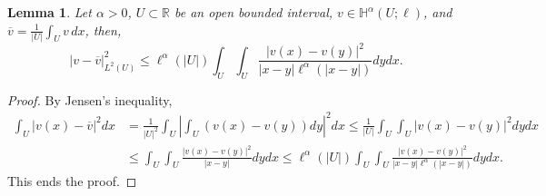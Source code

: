 \documentclass[10 pt]{article}
\newtheorem{lemma}[theorem]{Lemma}
\numberwithin{equation}{section}
\def\R{\mathbb{R}}
\begin{document}
\begin{lemma}\label{lem:poincare_type_weight}
Let $\alpha>0$, $U\subset \R$ be an open bounded interval, $v\in \mathbb H^{\alpha}(U;\ell)$, and $\overline v=\frac{1}{|U|}\int_{U}v\, dx$, then,
%
\begin{equation*}
    |v-\overline{v}|_{L^2(U)}^2\leq \ell^{\alpha}(|U|)\int_{U}\int_{U}\frac{|v(x)-v(y)|^2}{|x-y|\ell^{\alpha}(|x-y|)}dy dx.
\end{equation*}
%
\end{lemma}
%
\begin{proof}
By Jensen's inequality,
%
\begin{align*}
    \int_{U}|v(x)-\overline{v}|^2dx
    &=\frac{1}{|U|^2}\int_{U}\left|\int_{U}(v(x)-v(y))dy\right|^2dx \leq \frac{1}{|U|}\int_{U}\int_{U}|v(x)-v(y)|^2dy dx\\
&\leq \int_{U}\int_{U}\frac{|v(x)-v(y)|^2}{|x-y|}dy dx \leq \ell^{\alpha}(|U|)\int_{U}\int_{U}\frac{|v(x)-v(y)|^2}{|x-y|\ell^{\alpha}(|x-y|)}dy dx.
\end{align*}
%
This ends the proof. 
\end{proof}
\end{document}
